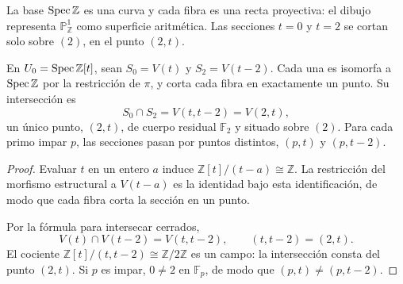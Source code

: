 \begin{center}
\end{center}
La base $\operatorname{Spec}\mathbb Z$ es una curva y cada fibra es una recta proyectiva: el dibujo representa $\mathbb P_{\mathbb Z}^1$ como superficie aritmética. Las secciones $t=0$ y $t=2$ se cortan solo sobre $(2)$, en el punto $(2,t)$.

\begin{prop}[Las secciones $t=0$ y $t=2$]
\label{prop:s08-secciones-cero-dos}
En $U_0=\operatorname{Spec}\mathbb Z[t]$, sean $S_0=V(t)$ y $S_2=V(t-2)$. Cada una es isomorfa a $\operatorname{Spec}\mathbb Z$ por la restricción de $\pi$, y corta cada fibra en exactamente un punto. Su intersección es
\[
S_0\cap S_2=V(t,t-2)=V(2,t),
\]
un único punto, $(2,t)$, de cuerpo residual $\mathbb F_2$ y situado sobre $(2)$. Para cada primo impar $p$, las secciones pasan por puntos distintos, $(p,t)$ y $(p,t-2)$.
\end{prop}
\begin{proof}
Evaluar $t$ en un entero $a$ induce $\mathbb Z[t]/(t-a)\cong\mathbb Z$. La restricción del morfismo estructural a $V(t-a)$ es la identidad bajo esta identificación, de modo que cada fibra corta la sección en un punto.

Por la fórmula para intersecar cerrados,
\[
V(t)\cap V(t-2)=V(t,t-2),\qquad
(t,t-2)=(2,t).
\]
El cociente $\mathbb Z[t]/(t,t-2)\cong\mathbb Z/2\mathbb Z$ es un campo: la intersección consta del punto $(2,t)$. Si $p$ es impar, $0\ne2$ en $\mathbb F_p$, de modo que $(p,t)\ne(p,t-2)$.
\end{proof}

